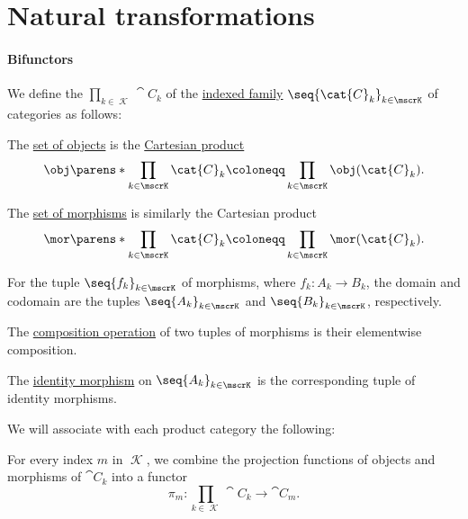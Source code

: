 \section{Natural transformations}\label{sec:natural_transformations}

\paragraph{Bifunctors}

\begin{definition}\label{def:product_category}\mimprovised
  We define the  \( \prod_{k \in \mscrK} \cat{C}_k \) of the \hyperref[def:indexed_family]{indexed family} \( \seq{ \cat{C}_k }_{k \in \mscrK} \) of categories as follows:
  \begin{thmenum}[series=def:product_category]
     The \hyperref[def:category/objects]{set of objects} is the \hyperref[def:cartesian_product]{Cartesian product}
    \begin{equation*}
      \obj\parens*{ \prod_{k \in \mscrK} \cat{C}_k } \coloneqq \prod_{k \in \mscrK} \obj(\cat{C}_k).
    \end{equation*}

     The \hyperref[def:category/morphisms]{set of morphisms} is similarly the Cartesian product
    \begin{equation*}
      \mor\parens*{ \prod_{k \in \mscrK} \cat{C}_k } \coloneqq \prod_{k \in \mscrK} \mor(\cat{C}_k).
    \end{equation*}

    For the tuple \( \seq{ f_k }_{k \in \mscrK} \) of morphisms, where \( f_k: A_k \to B_k \), the domain and codomain are the tuples \( \seq{ A_k }_{k \in \mscrK} \) and \( \seq{ B_k }_{k \in \mscrK} \), respectively.

     The \hyperref[def:category/composition]{composition operation} of two tuples of morphisms is their elementwise composition.

     The \hyperref[def:category/identity]{identity morphism} on \( \seq{ A_k }_{k \in \mscrK} \) is the corresponding tuple of identity morphisms.
  \end{thmenum}

  We will associate with each product category the following:
  \begin{thmenum}[resume=def:product_category]
     For every index \( m \) in \( \mscrK \), we combine the projection functions of objects and morphisms of \( \cat{C}_k \) into a functor
    \begin{equation*}
      \pi_m: \prod_{k \in \mscrK} \cat{C}_k \to \cat{C}_m.
    \end{equation*}
  \end{thmenum}
\end{definition}
